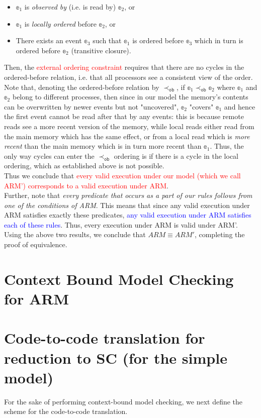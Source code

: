 \documentclass{article}
\begin{document}
\begin{itemize}
    \item $\mathbb{e}_1$ is \textit{observed by} (i.e. is read by) $\mathbb{e}_2$, or
    \item $\mathbb{e}_1$ is \textit{locally ordered} before $\mathbb{e}_2$, or
    \item There exists an event $\mathbb{e}_3$ such that $\mathbb{e}_1$ is ordered before $\mathbb{e}_3$ which in turn is ordered before $\mathbb{e}_2$ (transitive closure).
\end{itemize}
Then, the \textcolor{red}{external ordering constraint} requires that there are no cycles in the ordered-before relation, i.e. that all processors see a consistent view of the order. Note that, denoting the ordered-before relation by $\prec_\texttt{ob}$, if $\mathbb{e}_1 \prec_\texttt{ob} \mathbb{e}_2$ where $\mathbb{e}_1$ and $\mathbb{e}_2$ belong to different processes, then since in our model the memory's contents can be overwritten by newer events but not "uncovered", $\mathbb{e}_2$ "covers" $\mathbb{e}_1$ and hence the first event cannot be read after that by any events: this is because remote reads see a more recent version of the memory, while local reads either read from the main memory which has the same effect, or from a local read which is \textit{more recent} than the main memory which is in turn more recent than $\mathbb{e}_1$. Thus, the only way cycles can enter the $\prec_\texttt{ob}$ ordering is if there is a cycle in the local ordering, which as established above is not possible.\\
Thus we conclude that \textcolor{red}{every valid execution under our model (which we call ARM') corresponds to a valid execution under ARM}.\\
Further, note that \textit{every predicate that occurs as a part of our rules follows from one of the conditions of ARM}. This means that since any valid execution under ARM satisfies exactly these predicates, \textcolor{blue}{any valid execution under ARM satisfies each of these rules}. Thus, every execution under ARM is valid under ARM'.\\
Using the above two results, we conclude that $\boxed{ARM \equiv ARM'}$, completing the proof of equivalence.
\section{Context Bound Model Checking for ARM}
\section{Code-to-code translation for reduction to SC (for the simple model) }
For the sake of performing context-bound model checking, we next define the scheme for the code-to-code translation.
\end{document}
